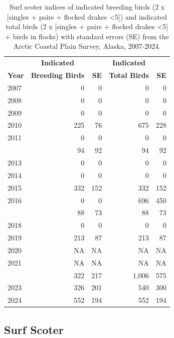 \documentclass[
]{article}
\begin{document}
\begingroup\fontsize{10}{12}\selectfont

\begin{longtable}[t]{lrrrr}

\caption{\label{tbl-SUSC}Surf scoter indices of indicated breeding birds
(2 x {[}singles + pairs + flocked drakes \textless5{]}) and indicated
total birds (2 x {[}singles + pairs + flocked drakes \textless5{]} +
birds in flocks) with standard errors (SE) from the Arctic Coastal Plain
Survey, Alaska, 2007-2024.}

\tabularnewline

\\
\toprule
\multicolumn{1}{c}{\textbf{ }} & \multicolumn{1}{c}{\textbf{Indicated}} & \multicolumn{1}{c}{\textbf{ }} & \multicolumn{1}{c}{\textbf{Indicated}} & \multicolumn{1}{c}{\textbf{ }} \\
\cmidrule(l{3pt}r{3pt}){2-2} \cmidrule(l{3pt}r{3pt}){4-4}
\textbf{Year} & \textbf{Breeding Birds} & \textbf{SE} & \textbf{Total Birds} & \textbf{SE}\\
\midrule
2007 & 0 & 0 & 0 & 0\\
2008 & 0 & 0 & 0 & 0\\
2009 & 0 & 0 & 0 & 0\\
2010 & 225 & 76 & 675 & 228\\
2011 & 0 & 0 & 0 & 0\\
\addlinespace
2012 & 94 & 92 & 94 & 92\\
2013 & 0 & 0 & 0 & 0\\
2014 & 0 & 0 & 0 & 0\\
2015 & 332 & 152 & 332 & 152\\
2016 & 0 & 0 & 696 & 450\\
\addlinespace
2017 & 88 & 73 & 88 & 73\\
2018 & 0 & 0 & 0 & 0\\
2019 & 213 & 87 & 213 & 87\\
2020 & NA & NA & NA & NA\\
2021 & NA & NA & NA & NA\\
\addlinespace
2022 & 322 & 217 & 1,006 & 575\\
2023 & 326 & 201 & 540 & 300\\
2024 & 552 & 194 & 552 & 194\\
\bottomrule

\end{longtable}

\endgroup{}

\newpage{}

\subsection*{Surf Scoter}\label{surf-scoter-2}
\end{document}
